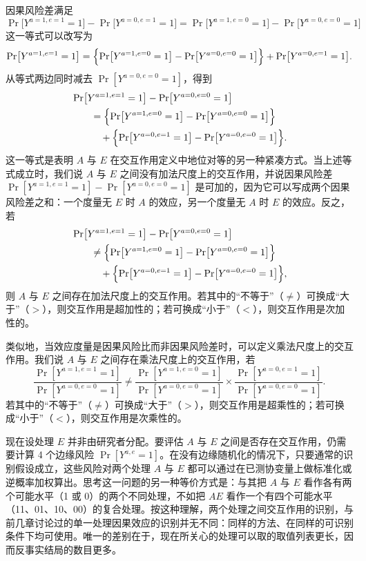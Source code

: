 \renewcommand{\TPname}{技术注记（Technical Point）}
\begin{techpoint}[加法尺度与乘法尺度上的交互作用]
因果风险差满足
\[
\Pr\bigl[Y^{a=1,e=1}=1\bigr]-\Pr\bigl[Y^{a=0,e=1}=1\bigr]=\Pr\bigl[Y^{a=1,e=0}=1\bigr]-\Pr\bigl[Y^{a=0,e=0}=1\bigr]
\]
这一等式可以改写为
\[
\Pr\bigl[Y^{a=1,e=1}=1\bigr]=\Bigl\{\Pr\bigl[Y^{a=1,e=0}=1\bigr]-\Pr\bigl[Y^{a=0,e=0}=1\bigr]\Bigr\}+\Pr\bigl[Y^{a=0,e=1}=1\bigr].
\]
从等式两边同时减去 $\Pr[Y^{a=0,e=0}=1]$，得到
\[
\begin{aligned}
&\Pr\bigl[Y^{a=1,e=1}=1\bigr]-\Pr\bigl[Y^{a=0,e=0}=1\bigr]\\
&\qquad=\Bigl\{\Pr\bigl[Y^{a=1,e=0}=1\bigr]-\Pr\bigl[Y^{a=0,e=0}=1\bigr]\Bigr\}\\
&\qquad\quad+\Bigl\{\Pr\bigl[Y^{a=0,e=1}=1\bigr]-\Pr\bigl[Y^{a=0,e=0}=1\bigr]\Bigr\}.
\end{aligned}
\]
这一等式是表明 $A$ 与 $E$ 在交互作用定义中地位对等的另一种紧凑方式。当上述等式成立时，我们说 $A$ 与 $E$ 之间没有加法尺度上的交互作用，并说因果风险差 $\Pr[Y^{a=1,e=1}=1]-\Pr[Y^{a=0,e=0}=1]$ 是可加的，因为它可以写成两个因果风险差之和：一个度量无 $E$ 时 $A$ 的效应，另一个度量无 $A$ 时 $E$ 的效应。反之，若
\[
\begin{aligned}
&\Pr\bigl[Y^{a=1,e=1}=1\bigr]-\Pr\bigl[Y^{a=0,e=0}=1\bigr]\\
&\qquad\neq\Bigl\{\Pr\bigl[Y^{a=1,e=0}=1\bigr]-\Pr\bigl[Y^{a=0,e=0}=1\bigr]\Bigr\}\\
&\qquad\quad+\Bigl\{\Pr\bigl[Y^{a=0,e=1}=1\bigr]-\Pr\bigl[Y^{a=0,e=0}=1\bigr]\Bigr\},
\end{aligned}
\]
则 $A$ 与 $E$ 之间存在加法尺度上的交互作用。若其中的“不等于”（$\neq$）可换成“大于”（$>$），则交互作用是超加性的；若可换成“小于”（$<$），则交互作用是次加性的。

类似地，当效应度量是因果风险比而非因果风险差时，可以定义乘法尺度上的交互作用。我们说 $A$ 与 $E$ 之间存在乘法尺度上的交互作用，若
\[
\frac{\Pr[Y^{a=1,e=1}=1]}{\Pr[Y^{a=0,e=0}=1]}
\neq
\frac{\Pr[Y^{a=1,e=0}=1]}{\Pr[Y^{a=0,e=0}=1]}
\times
\frac{\Pr[Y^{a=0,e=1}=1]}{\Pr[Y^{a=0,e=0}=1]}.
\]
若其中的“不等于”（$\neq$）可换成“大于”（$>$），则交互作用是超乘性的；若可换成“小于”（$<$），则交互作用是次乘性的。
\end{techpoint}
\renewcommand{\TPname}{技术注记}

现在设处理 $E$ 并非由研究者分配。要评估 $A$ 与 $E$ 之间是否存在交互作用，仍需要计算 4 个边缘风险 $\Pr[Y^{a,e}=1]$。在没有边缘随机化的情况下，只要通常的识别假设成立，这些风险对两个处理 $A$ 与 $E$ 都可以通过在已测协变量上做标准化或逆概率加权算出。思考这一问题的另一种等价方式是：与其把 $A$ 与 $E$ 看作各有两个可能水平（1 或 0）的两个不同处理，不如把 $AE$ 看作一个有四个可能水平（11、01、10、00）的复合处理。按这种理解，两个处理之间交互作用的识别，与前几章讨论过的单一处理因果效应的识别并无不同：同样的方法、在同样的可识别条件下均可使用。唯一的差别在于，现在所关心的处理可以取的取值列表更长，因而反事实结局的数目更多。

